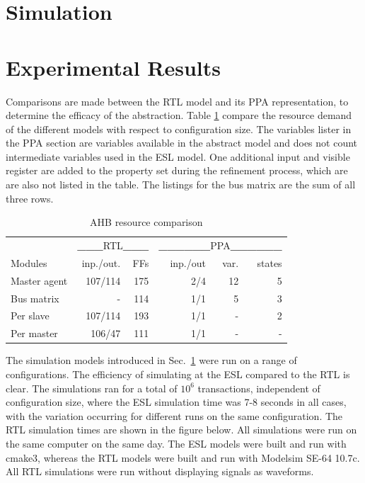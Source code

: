 \section{Simulation}
\label{sec:sim}


\section{Experimental Results}
Comparisons are made between the RTL model and its PPA representation, to determine the efficacy of the abstraction. Table \ref{tab:stats} compare the resource demand of the different models with respect to configuration size. The variables lister in the PPA section are variables available in the abstract model and does not count intermediate variables used in the ESL model. One additional input and visible register are added to the property set during the refinement process, which are are also not listed in the table. The listings for the bus matrix are the sum of all three rows.

\begin{table}[hbt] 
  \begin{tabular}{ l r r r r r}
  \hline 
  \hline
      & \multicolumn{2}{c}{\textbf{\_\_\_}RTL\textbf{\_\_\_}} & \multicolumn{3}{c}{\textbf{\_\_\_\_\_\_}PPA\textbf{\_\_\_\_\_\_}} \\
  Modules & inp./out. & FFs & inp./out & var. & states \\
    \hline
  Master agent & 107/114 & 175 & 2/4 & 12 & 5 \\
  \hline
  Bus matrix & - & 114 & 1/1 & 5 & 3 \\
  
  Per slave & 107/114 & 193 & 1/1 & - & 2 \\
 
  Per master & 106/47 & 111 & 1/1 & - & - \\
    \hline
    \hline  
  \end{tabular}
\caption{AHB resource comparison}
\label{tab:stats}
\end{table}

The simulation models introduced in Sec.~\ref{sec:sim} were run on a range of configurations. The efficiency of simulating at the ESL compared to the RTL is clear. The simulations ran for a total of $10^6$ transactions, independent of configuration size, where the ESL simulation time was 7-8 seconds in all cases, with the variation occurring for different runs on the same configuration. The RTL simulation times are shown in the figure below. All simulations were run on the same computer on the same day. The ESL models were built and run with cmake3, whereas the RTL models were built and run with Modelsim SE-64 10.7c. All RTL simulations were run without displaying signals as waveforms. \\

